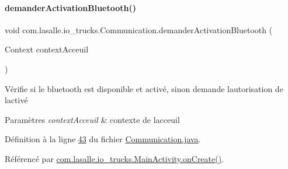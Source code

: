 \paragraph{\texorpdfstring{demander\+Activation\+Bluetooth()}{demanderActivationBluetooth()}}
{\footnotesize\ttfamily void com.\+lasalle.\+io\+\_\+trucks.\+Communication.\+demander\+Activation\+Bluetooth (\begin{DoxyParamCaption}\item[{Context}]{context\+Acceuil }\end{DoxyParamCaption})}



Vérifie si le bluetooth est disponible et activé, sinon demande l\textquotesingle{}autorisation de l\textquotesingle{}activé 


\begin{DoxyParams}{Paramètres}
{\em context\+Acceuil} & contexte de l\textquotesingle{}acceuil \\
\hline
\end{DoxyParams}


Définition à la ligne \hyperlink{_communication_8java_source_l00043}{43} du fichier \hyperlink{_communication_8java_source}{Communication.\+java}.



Référencé par \hyperlink{_main_activity_8java_source_l00059}{com.\+lasalle.\+io\+\_\+trucks.\+Main\+Activity.\+on\+Create()}.


